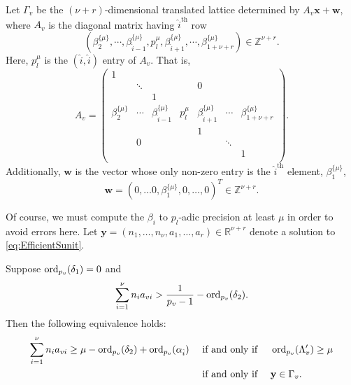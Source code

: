 Let $\Gamma_{v}$ be the $(\nu+r)$-dimensional translated lattice determined by $A_{v}\mathbf{x} + \mathbf{w}$, where $A_{v}$ is the diagonal matrix having $\hat{i}^{\text{th}}$ row 
\[\left(\beta_2^{\{\mu\}}, \cdots, \beta_{\hat{i} - 1}^{\{\mu\}}, p_l^{\mu}, \beta_{\hat{i} + 1}^{\{\mu\}}, \cdots, \beta_{1+ \nu+ r}^{\{\mu\}}\right) \in \mathbb{Z}^{\nu+r}.\]
Here, $p_l^{\mu}$ is the $(\hat{i},\hat{i})$ entry of $A_{v}$. That is, 
\[A_{v} = 
\begin{pmatrix}
1	& 		&		&		&		&		&	\\
	& \ddots	& 		&		& 0		& 		&	\\
	&		& 1		&		&		&		&	\\
	\beta_2^{\{\mu\}}& \cdots & \beta_{\hat{i} - 1}^{\{\mu\}} & p_l^{\mu} & \beta_{\hat{i} + 1}^{\{\mu\}}& \cdots &\beta_{1+ \nu+ r}^{\{\mu\}}\\
	& 		& 		& 		& 1		&		&	\\	
	& 0		& 		& 		&		& \ddots	&	\\	
	& 		& 		& 		&		& 		& 1	\\	
\end{pmatrix}.\]
Additionally, $\mathbf{w}$ is the vector whose only non-zero entry is the $\hat{i}^{\text{th}}$ element, $ \beta_1^{\{\mu\}}$,
\[\mathbf{w} = (0, \dots 0, \beta_1^{\{\mu\}},0, \dots, 0)^T \in \mathbb{Z}^{\nu + r}.\]

Of course, we must compute the $\beta_i$ to $p_l$-adic precision at least $\mu$ in order to avoid errors here. 
Let $\mathbf{y} = (n_1, \dots, n_{\nu}, a_1, \dots, a_r) \in \mathbb{R}^{\nu + r}$ denote a solution to \eqref{eq:EfficientSunit}. 

\begin{lemma}
Suppose $\operatorname{ord}_{p_v}(\delta_1) = 0$ and 
\[\sum_{i = 1}^{\nu} n_{i}a_{vi} > \frac{1}{p_v-1} - \operatorname{ord}_{p_v}(\delta_2).\]
Then the following equivalence holds: 
\begin{align*}
\sum_{i = 1}^{\nu} n_{i}a_{vi}  \geq \mu - \operatorname{ord}_{p_v}(\delta_2) + \operatorname{ord}_{p_v}(\alpha_{\hat{i}}) 
	& \quad \text{ if and only if } \quad \operatorname{ord}_{p_v}(\Lambda_v') \geq \mu \\
	& \quad \text{ if and only if } \quad \mathbf{y} \in\Gamma_v.
\end{align*}
\end{lemma} 

